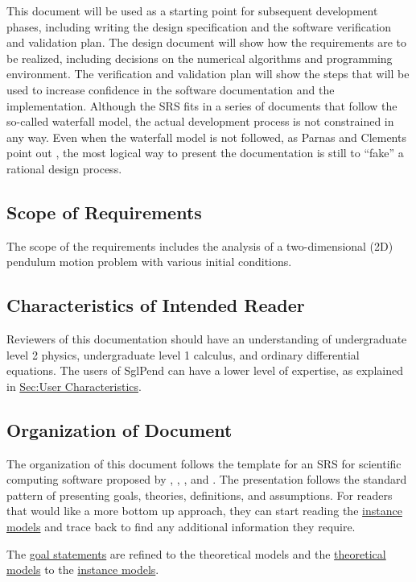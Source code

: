 \documentclass[12pt]{article}
\begin{document}
This document will be used as a starting point for subsequent development phases, including writing the design specification and the software verification and validation plan. The design document will show how the requirements are to be realized, including decisions on the numerical algorithms and programming environment. The verification and validation plan will show the steps that will be used to increase confidence in the software documentation and the implementation. Although the SRS fits in a series of documents that follow the so-called waterfall model, the actual development process is not constrained in any way. Even when the waterfall model is not followed, as Parnas and Clements point out \cite{parnasClements1986}, the most logical way to present the documentation is still to ``fake'' a rational design process.

\subsection{Scope of Requirements}
\label{Sec:ReqsScope}
The scope of the requirements includes the analysis of a two-dimensional (2D) pendulum motion problem with various initial conditions.

\subsection{Characteristics of Intended Reader}
\label{Sec:ReaderChars}
Reviewers of this documentation should have an understanding of undergraduate level 2 physics, undergraduate level 1 calculus, and ordinary differential equations. The users of SglPend can have a lower level of expertise, as explained in \hyperref[Sec:UserChars]{Sec:User Characteristics}.

\subsection{Organization of Document}
\label{Sec:DocOrg}
The organization of this document follows the template for an SRS for scientific computing software proposed by \cite{koothoor2013}, \cite{smithLai2005}, \cite{smithEtAl2007}, and \cite{smithKoothoor2016}. The presentation follows the standard pattern of presenting goals, theories, definitions, and assumptions. For readers that would like a more bottom up approach, they can start reading the \hyperref[Sec:IMs]{instance models} and trace back to find any additional information they require.

The \hyperref[Sec:GoalStmt]{goal statements} are refined to the theoretical models and the \hyperref[Sec:TMs]{theoretical models} to the \hyperref[Sec:IMs]{instance models}.
\end{document}
